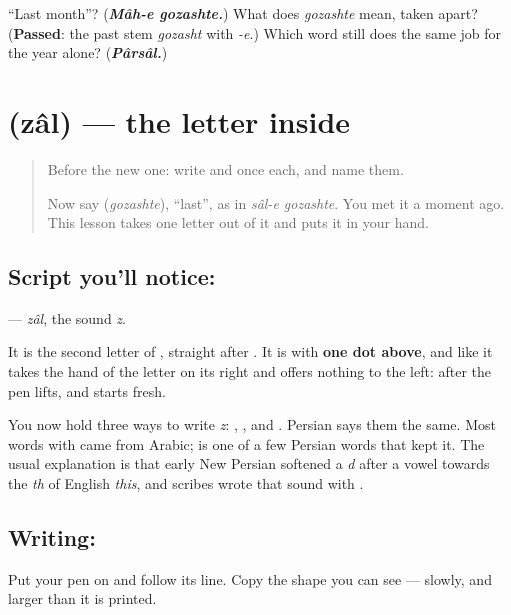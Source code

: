 \begin{tcolorbox}[breakable,colback=teal!4,colframe=teal!35!black,title={Before you move on}]
\textquotedblleft{}Last month\textquotedblright{}? (\emph{\textbf{Mâh-e gozashte.}}) What does \emph{gozashte} mean, taken apart? (\textbf{Passed}: the past stem \emph{gozasht} with \emph{-e}.) Which word still does the same job for the year alone? (\emph{\textbf{Pârsâl.}})
\end{tcolorbox}
\section[\texorpdfstring{\fa{ذ} (zâl)}{ذ (zâl)}]{ (zâl) — the letter inside }

\label{lesson:FA-W290-zal}



\begin{quote}
Before the new one: write  and  once each, and name them.

Now say \textbf{} (\emph{gozashte}), \textquotedblleft{}last\textquotedblright{}, as in \emph{sâl-e gozashte}. You met it a moment ago. This lesson takes one letter out of it and puts it in your hand.
\end{quote}

\subsection*{Script you'll notice: }
\textbf{} — \emph{zâl}, the sound \emph{z}.

It is the second letter of \textbf{}, straight after \textbf{}. It is \textbf{} with \textbf{one dot above}, and like \textbf{} it takes the hand of the letter on its right and offers nothing to the left: after \textbf{} the pen lifts, and \textbf{} starts fresh.

You now hold three ways to write \emph{z}: \textbf{}, \textbf{}, and \textbf{}. Persian says them the same. Most words with \textbf{} came from Arabic; \textbf{} is one of a few Persian words that kept it. The usual explanation is that early New Persian softened a \emph{d} after a vowel towards the \emph{th} of English \emph{this}, and scribes wrote that sound with \textbf{}.

\subsection*{Writing: }
Put your pen on  and follow its line. Copy the shape you can see — slowly, and larger than it is printed.

